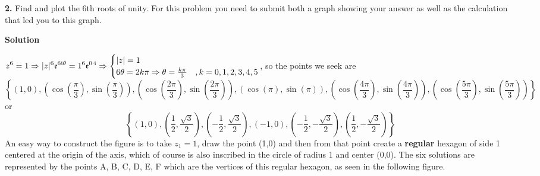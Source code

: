 \documentclass[11pt]{amsart}
\newcommand{\dsp}{\displaystyle}
\begin{document}
\textbf{2.} Find and plot the 6th roots of unity. For this problem you need to submit both 
a graph showing your answer as well as the calculation that led you to this graph. 
\begin{center}
\textbf{Solution}
\end{center}
$\dsp z^6=1\Rightarrow |z|^{6}\mathfrak{e}^{6\mi\theta}=1^{6}\mathfrak{e}^{0\cdot\mi}\Rightarrow 
\begin{cases}|z|=1&\\6\theta=2k\pi\Rightarrow 
\theta=\frac{k\pi}{3}&,k=0,1,2,3,4,5\end{cases}$, so the points we seek are
\[
\left\{(1,0),\left(\cos\left(\frac{\pi}{3}\right),\sin\left(\frac{\pi}{3}\right)\right),
\left(\cos\left(\frac{2\pi}{3}\right),\sin\left(\frac{2\pi}{3}\right)\right),
\left(\cos\left(\pi\right) 
,\sin\left(\pi\right)\right),\left(\cos\left(\frac{4\pi}{3}\right),
\sin\left(\frac{4\pi}{3}\right)\right),\left(\cos\left(\frac{5\pi}{3}\right),
\sin\left(\frac{5\pi}{3}
 \right)\right)\right\}
\]
or 
\[
 \left\{(1,0),\left(\frac{1}{2},\frac{\sqrt{3}}{2}\right),\left(-\frac{1}{2},\frac{\sqrt{3}}{2}\right),(-1,0),
 \left(-\frac{1}{2},-\frac{\sqrt{3}}{2}\right),\left(\frac{1}{2},-\frac{\sqrt{3}}{2}\right)\right\}
\]
An easy way to construct the figure is to take $z_1=1$, draw the point (1,0) and then from that point create a 
\textbf{regular} hexagon of side 1 centered at the origin of the axis, which of course is 
also inscribed in the circle of radius 1 and center (0,0). The six solutions are 
represented by the  points A, B, C, D, E, F which are 
the vertices of this regular hexagon, as seen in the following figure.
\end{document}
